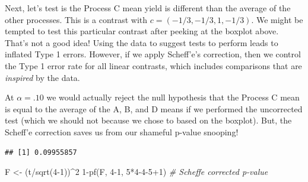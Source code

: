 \documentclass[
]{book}
\newenvironment{Shaded}{\begin{snugshade}}{\end{snugshade}}
\newcommand{\CommentTok}[1]{\textcolor[rgb]{0.56,0.35,0.01}{\textit{#1}}}
\newcommand{\DecValTok}[1]{\textcolor[rgb]{0.00,0.00,0.81}{#1}}
\newcommand{\FunctionTok}[1]{\textcolor[rgb]{0.00,0.00,0.00}{#1}}
\newcommand{\NormalTok}[1]{#1}
\newcommand{\OtherTok}[1]{\textcolor[rgb]{0.56,0.35,0.01}{#1}}
\newcommand{\SpecialCharTok}[1]{\textcolor[rgb]{0.00,0.00,0.00}{#1}}
\begin{document}
Next, let's test is the Process C mean yield is different than the average of the other processes. This is a contrast with \(c = (-1/3,-1/3,1,-1/3)\). We might be tempted to test this particular contrast after peeking at the boxplot above. That's not a good idea! Using the data to suggest tests to perform leads to inflated Type 1 errors. However, if we apply Scheff'e's correction, then we control the Type 1 error rate for all linear contrasts, which includes comparisons that are \emph{inspired} by the data.

At \(\alpha = .10\) we would actually reject the null hypothesis that the Process C mean is equal to the average of the A, B, and D means if we performed the uncorrected test (which we should not because we chose to based on the boxplot). But, the Scheff'e correction saves us from our shameful p-value snooping!

\begin{Shaded}
\end{Shaded}

\begin{verbatim}
## [1] 0.09955857
\end{verbatim}

\begin{Shaded}
\begin{Highlighting}[]
\NormalTok{F }\OtherTok{\textless{}{-}}\NormalTok{ (t}\SpecialCharTok{/}\FunctionTok{sqrt}\NormalTok{(}\DecValTok{4{-}1}\NormalTok{))}\SpecialCharTok{\^{}}\DecValTok{2}
\DecValTok{1}\SpecialCharTok{{-}}\FunctionTok{pf}\NormalTok{(F, }\DecValTok{4{-}1}\NormalTok{, }\DecValTok{5}\SpecialCharTok{*}\DecValTok{4{-}4{-}5}\SpecialCharTok{+}\DecValTok{1}\NormalTok{) }\CommentTok{\# Scheffe corrected p{-}value}
\end{Highlighting}
\end{Shaded}
\end{document}
